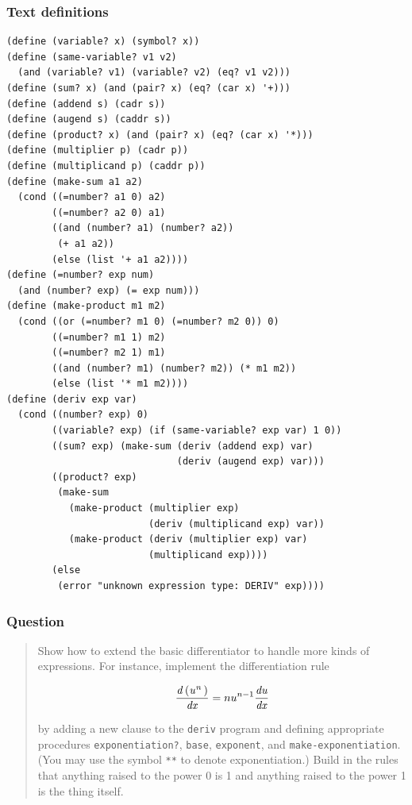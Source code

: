 \documentclass[final,fleqn,titlepage,twoside]{article}
\begin{document}
\subsubsection{Text definitions}
\label{sec:org628e007}
\begin{verbatim}
(define (variable? x) (symbol? x))
(define (same-variable? v1 v2)
  (and (variable? v1) (variable? v2) (eq? v1 v2)))
(define (sum? x) (and (pair? x) (eq? (car x) '+)))
(define (addend s) (cadr s))
(define (augend s) (caddr s))
(define (product? x) (and (pair? x) (eq? (car x) '*)))
(define (multiplier p) (cadr p))
(define (multiplicand p) (caddr p))
(define (make-sum a1 a2)
  (cond ((=number? a1 0) a2)
        ((=number? a2 0) a1)
        ((and (number? a1) (number? a2))
         (+ a1 a2))
        (else (list '+ a1 a2))))
(define (=number? exp num)
  (and (number? exp) (= exp num)))
(define (make-product m1 m2)
  (cond ((or (=number? m1 0) (=number? m2 0)) 0)
        ((=number? m1 1) m2)
        ((=number? m2 1) m1)
        ((and (number? m1) (number? m2)) (* m1 m2))
        (else (list '* m1 m2))))
(define (deriv exp var)
  (cond ((number? exp) 0)
        ((variable? exp) (if (same-variable? exp var) 1 0))
        ((sum? exp) (make-sum (deriv (addend exp) var)
                              (deriv (augend exp) var)))
        ((product? exp)
         (make-sum
           (make-product (multiplier exp)
                         (deriv (multiplicand exp) var))
           (make-product (deriv (multiplier exp) var)
                         (multiplicand exp))))
        (else
         (error "unknown expression type: DERIV" exp))))
\end{verbatim}

\subsubsection{Question}
\label{sec:org7169c4b}
\begin{quote}
Show how to extend the basic differentiator to handle more kinds of expressions.
For instance, implement the differentiation rule

\[ \frac{\it d\,(u^n\,)}{\it dx} = nu^{n-1} \frac{\it du}{\it dx} \]

by adding a new clause to the \texttt{deriv} program and defining appropriate
procedures \texttt{exponentiation?}, \texttt{base}, \texttt{exponent},
and \texttt{make-exponentiation}. (You may use the symbol \texttt{**} to
denote exponentiation.) Build in the rules that anything raised to the power 0
is 1 and anything raised to the power 1 is the thing itself.
\end{quote}
\end{document}
